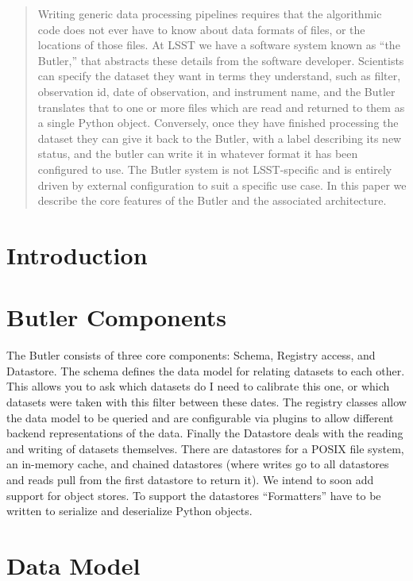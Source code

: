 \documentclass[11pt,twoside]{article}
\begin{document}
\begin{abstract}
  Writing generic data processing pipelines requires that the algorithmic code does not ever have to know about data formats of files, or the locations of those files.
  At LSST we have a software system known as ``the Butler,'' that abstracts these details from the software developer.
  Scientists can specify the dataset they want in terms they understand, such as filter, observation id, date of observation, and instrument name, and the Butler translates that to one or more files which are read and returned to them as a single Python object.
  Conversely, once they have finished processing the dataset they can give it back to the Butler, with a label describing its new status, and the butler can write it in whatever format it has been configured to use.
  The Butler system is not LSST-specific and is entirely driven by external configuration to suit a specific use case.
  In this paper we describe the core features of the Butler and the associated architecture.
\end{abstract}

\section{Introduction}

\section{Butler Components}

The Butler consists of  three core components: Schema, Registry access, and Datastore.
The schema defines the data model for relating datasets to each other.
This allows you to ask which datasets do I need to calibrate this one, or which datasets were taken with this filter between these dates.
The registry classes allow the data model to be queried and are configurable via plugins to allow different backend representations of the data.
Finally the Datastore deals with the reading and writing of datasets themselves.
There are datastores for a POSIX file system, an in-memory cache, and chained datastores (where writes go to all datastores and reads pull from the first datastore to return it).
We intend to soon add support for object stores.
To support the datastores ``Formatters'' have to be written to serialize and deserialize Python objects.

\section{Data Model}
\end{document}
